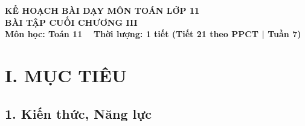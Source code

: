 \documentclass[12pt, a4paper]{article}
\begin{document}
\begin{center}
    {\fontsize{14pt}{17pt}\selectfont \textbf{KẾ HOẠCH BÀI DẠY MÔN TOÁN LỚP 11}}\\[6pt]
    {\fontsize{16pt}{19pt}\selectfont \textbf{BÀI TẬP CUỐI CHƯƠNG III}}\\[4pt]
    {\fontsize{12pt}{15pt}\selectfont \textbf{Môn học: Toán 11} \ \textbar \ \textbf{Thời lượng: 1 tiết (Tiết 21 theo PPCT | Tuần 7)}}
\end{center}

\vspace{5pt}

\section*{I. MỤC TIÊU}

\subsection*{1. Kiến thức, Năng lực}
\end{document}
